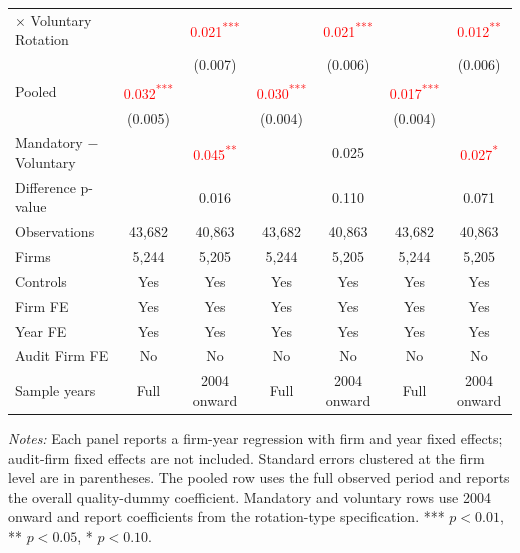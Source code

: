 \documentclass[10pt]{article}
\newcommand{\sym}[1]{\textsuperscript{#1}}
\begin{document}
\begin{minipage}{19cm}
\begin{threeparttable}
\begin{tabular}{l cc cc cc}
$\times$ Voluntary Rotation &  & \textcolor{red}{0.021\sym{***}} &  & \textcolor{red}{0.021\sym{***}} &  & \textcolor{red}{0.012\sym{**}} \\
 &  & (0.007) &  & (0.006) &  & (0.006) \\
Pooled & \textcolor{red}{0.032\sym{***}} &  & \textcolor{red}{0.030\sym{***}} &  & \textcolor{red}{0.017\sym{***}} &  \\
 & (0.005) &  & (0.004) &  & (0.004) &  \\
Mandatory $-$ Voluntary &  & \textcolor{red}{0.045\sym{**}} &  & 0.025 &  & \textcolor{red}{0.027\sym{*}} \\
Difference p-value &  & 0.016 &  & 0.110 &  & 0.071 \\
Observations & 43,682 & 40,863 & 43,682 & 40,863 & 43,682 & 40,863 \\
Firms & 5,244 & 5,205 & 5,244 & 5,205 & 5,244 & 5,205 \\
\midrule
Controls & Yes & Yes & Yes & Yes & Yes & Yes \\
Firm FE & Yes & Yes & Yes & Yes & Yes & Yes \\
Year FE & Yes & Yes & Yes & Yes & Yes & Yes \\
Audit Firm FE & No & No & No & No & No & No \\
Sample years & Full & 2004 onward & Full & 2004 onward & Full & 2004 onward \\
\bottomrule
\end{tabular}
\begin{tablenotes}\fontsize{9}{11}\selectfont
\item \fontsize{9}{11}\selectfont \textit{Notes:} Each panel reports a firm-year regression with firm and year fixed effects; audit-firm fixed effects are not included. Standard errors clustered at the firm level are in parentheses. The pooled row uses the full observed period and reports the overall quality-dummy coefficient. Mandatory and voluntary rows use 2004 onward and report coefficients from the rotation-type specification. *** \(p<0.01\), ** \(p<0.05\), * \(p<0.10\).
\end{tablenotes}
\end{threeparttable}

\end{minipage}
\end{document}
